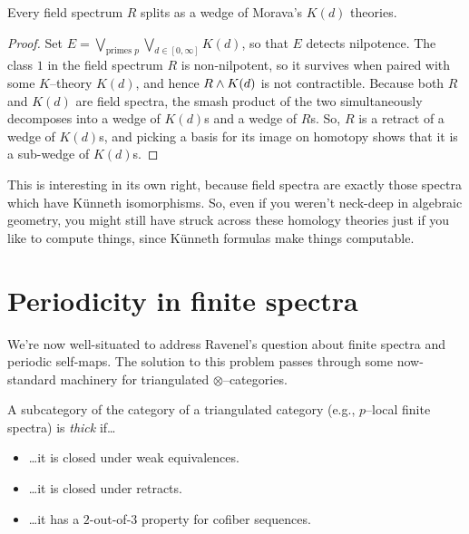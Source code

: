 \begin{corollary}\label{FieldSpectraAreKTheories}
Every field spectrum $R$ splits as a wedge of Morava's $K(d)$ theories.
\end{corollary}
\begin{proof}
Set $E = \bigvee_{\text{primes $p$}} \bigvee_{d \in [0, \infty]} K(d)$, so that $E$ detects nilpotence.  The class $1$ in the field spectrum $R$ is non-nilpotent, so it survives when paired with some $K$--theory $K(d)$, and hence $R \wedge K(d)$ is not contractible.  Because both $R$ and $K(d)$ are field spectra, the smash product of the two simultaneously decomposes into a wedge of $K(d)$s and a wedge of $R$s.  So, $R$ is a retract of a wedge of $K(d)$s, and picking a basis for its image on homotopy shows that it is a sub-wedge of $K(d)$s.
\end{proof}

\begin{remark}
This is interesting in its own right, because field spectra are exactly those spectra which have K\"unneth isomorphisms.  So, even if you weren't neck-deep in algebraic geometry, you might still have struck across these homology theories just if you like to compute things, since K\"unneth formulas make things computable.
\end{remark}







\section{Periodicity in finite spectra}

We're now well-situated to address Ravenel's question about finite spectra and periodic self-maps.  The solution to this problem passes through some now-standard machinery for triangulated $\otimes$--categories.

\begin{definition}
A subcategory of the category of a triangulated category (e.g., $p$--local finite spectra) is \textit{thick} if\ldots{}
\begin{itemize}
\item \ldots it is closed under weak equivalences.
\item \ldots it is closed under retracts.
\item \ldots it has a $2$-out-of-$3$ property for cofiber sequences.
\end{itemize}
\end{definition}

